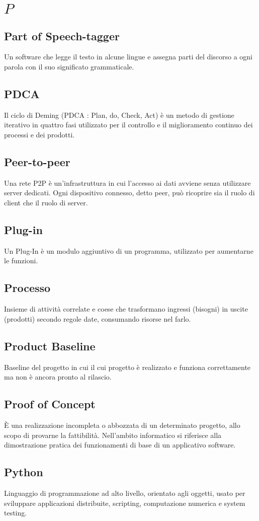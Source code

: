 \section{\quad$P\quad$}
\subsection{Part of Speech-tagger}
Un software che legge il testo in alcune lingue e assegna parti del discorso a ogni parola con il suo significato grammaticale.

\subsection{PDCA}
Il ciclo di Deming (PDCA : Plan, do, Check, Act) è un metodo di gestione iterativo in quattro fasi utilizzato per il controllo e il miglioramento continuo dei processi e dei prodotti.


\subsection{Peer-to-peer}
Una rete P2P è un’infrastruttura in cui l’accesso ai dati avviene senza utilizzare server dedicati. Ogni dispositivo connesso, detto peer, può ricoprire sia il ruolo di client che il ruolo di server.

\subsection{Plug-in}
Un Plug-In è un modulo aggiuntivo di un programma, utilizzato per aumentarne le funzioni.

\subsection{Processo}
Insieme di attività correlate e coese che trasformano ingressi (bisogni) in uscite (prodotti) secondo regole date, consumando risorse nel farlo.

\subsection{Product Baseline}
Baseline del progetto in cui il cui progetto è realizzato e funziona correttamente ma non è ancora pronto al rilascio.

\subsection{Proof of Concept}
È una realizzazione incompleta o abbozzata di un determinato progetto, allo scopo di provarne la fattibilità. Nell'ambito informatico si riferisce alla dimostrazione pratica dei funzionamenti di base di un applicativo software.

\subsection{Python}
Linguaggio di programmazione ad alto livello, orientato agli oggetti, usato per sviluppare applicazioni distribuite, scripting, computazione numerica e system testing.
